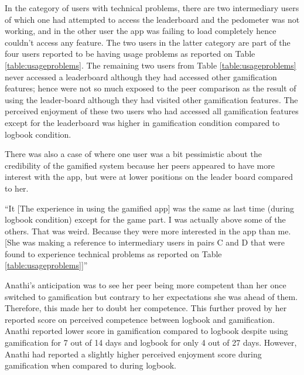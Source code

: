 In the category of users with technical problems, there are two intermediary users of which one had attempted to access  the leaderboard and the pedometer was not working, and in the other user the app was failing to load completely hence couldn't access any feature. The two users in the latter category are part of the four users reported to be having usage problems as reported on Table \ref{table:usageproblems}. The remaining two users from Table \ref{table:usageproblems} never accessed a leaderboard although they had accessed other gamification features; hence were not so much exposed to the peer comparison as the result of using the leader-board although they had visited other gamification features. The perceived enjoyment of these two users who had accessed all gamification features except for the leaderboard was higher in gamification condition compared to logbook condition.    

There was also a case of where one user was a bit pessimistic about the credibility of the gamified system because her peers appeared to have more interest with the app, but were at lower positions on the leader board compared to her. 

 {``It [The experience in using the gamified app] was the same as last time (during logbook condition) except for the game part. I was actually above some of the others. That was weird. Because they were more interested in the app than me.[She was making a reference to intermediary users in pairs C and D that were found to experience technical problems as reported on Table \ref{table:usageproblems}]''} 

Anathi's anticipation was to see her peer being more competent than her once switched to gamification but contrary to her expectations she was ahead of them.  Therefore, this made her to doubt her competence. This further proved by her reported score on perceived competence between logbook and gamification. Anathi reported lower score in gamification compared to logbook despite using gamification for 7 out of 14 days and logbook for only 4 out of 27 days. However, Anathi had reported a slightly higher perceived enjoyment score  during gamification when compared to during logbook.

